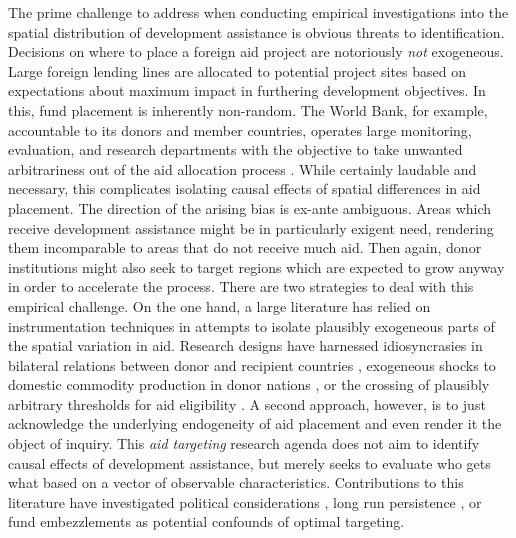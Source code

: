 \documentclass[11pt, oneside]{article}   	%
\begin{document}
The prime challenge to address when conducting empirical investigations into the spatial distribution of development assistance is obvious threats to identification. Decisions on where to place a foreign aid project are notoriously \emph{not} exogeneous. Large foreign lending lines are allocated to potential project sites based on expectations about maximum impact in furthering development objectives. In this, fund placement is inherently non-random. The World Bank, for example, accountable to its donors and member countries, operates large monitoring, evaluation, and research departments with the objective to take unwanted arbitrariness out of the aid allocation process \citep{Banerjee_EvaluationWorldBank_2006}. While certainly laudable and necessary, this complicates isolating causal effects of spatial differences in aid placement. The direction of the arising bias is ex-ante ambiguous. Areas which receive development assistance might be in particularly exigent need, rendering them incomparable to areas that do not receive much aid. Then again, donor institutions might also seek to target regions which are expected to grow anyway in order to accelerate the process. There are two strategies to deal with this empirical challenge. On the one hand, a large literature has relied on instrumentation techniques in attempts to isolate plausibly exogeneous parts of the spatial variation in aid. Research designs have harnessed idiosyncrasies in bilateral relations between donor and recipient countries \citep{Rajan_Aidgrowthwhat_2008}, exogeneous shocks to domestic commodity production in donor nations \citep{Nunn_USFoodAid_2014,Dreher_AidChinaGrowth_2017}, or the crossing of plausibly arbitrary thresholds for aid eligibility \citep{Galiani_effectaidgrowth_2017}. A second approach, however, is to just acknowledge the underlying endogeneity of aid placement and even render it the object of inquiry. This \emph{aid targeting} research agenda does not aim to identify causal effects of development assistance, but merely seeks to evaluate who gets what based on a vector of observable characteristics. Contributions to this literature have investigated political considerations \citep[e.g.][]{Dreher_Rogueaidempirical_2015}, long run persistence \citep{Alpino_LightingPathInfluence_2017}, or fund embezzlements \citep{Dreher_AiddemandAfrican_2016} as potential confounds of optimal targeting.
\end{document}

